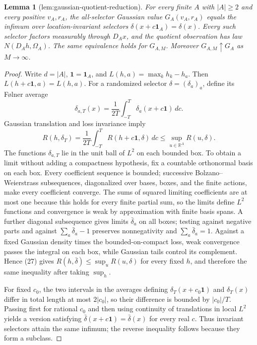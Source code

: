 \documentclass{article}
\newtheorem{lemma}{Lemma}
\begin{document}
\begin{lemma}[lem:gaussian-quotient-reduction]\label{lem:gaussian-quotient-reduction}
For every finite \(A\) with \(|A|\geq2\) and every positive \(v_A,r_A\), the all-selector Gaussian value \(G_A(v_A,r_A)\) equals the infimum over location-invariant selectors \(\delta(x+c\mathbf 1_A)=\delta(x)\).  Every such selector factors measurably through \(D_Ax\), and the quotient observation has law \(N(D_Ah,\Omega_A)\).  The same equivalence holds for \(G_{A,M}\).  Moreover \(G_{A,M}\uparrow G_A\) as \(M\to\infty\).
\end{lemma}
\begin{proof}
Write \(d=|A|\), \(\mathbf1=\mathbf1_A\), and \(L(h,a)=\max_kh_k-h_a\).  Then \(L(h+c\mathbf1,a)=L(h,a)\).  For a randomized selector \(\delta=(\delta_a)_a\), define its F{\o}lner average
\[
 \delta_{a,T}(x)=\frac1{2T}\int_{-T}^T\delta_a(x+c\mathbf1)\,dc.
\]
Gaussian translation and loss invariance imply
\[
 R(h,\delta_T)=\frac1{2T}\int_{-T}^TR(h+c\mathbf1,\delta)\,dc
 \leq\sup_{u\in\mathbb R^A}R(u,\delta). \tag{27}
\]
The functions \(\delta_{a,T}\) lie in the unit ball of \(L^2\) on each bounded box.  To obtain a limit without adding a compactness hypothesis, fix a countable orthonormal basis on each box.  Every coefficient sequence is bounded; successive Bolzano--Weierstrass subsequences, diagonalized over bases, boxes, and the finite actions, make every coefficient converge.  The sums of squared limiting coefficients are at most one because this holds for every finite partial sum, so the limits define \(L^2\) functions and convergence is weak by approximation with finite basis spans.  A further diagonal subsequence gives limits \(\bar\delta_a\) on all boxes; testing against negative parts and against \(\sum_a\bar\delta_a-1\) preserves nonnegativity and \(\sum_a\bar\delta_a=1\).  Against a fixed Gaussian density times the bounded-on-compact loss, weak convergence passes the integral on each box, while Gaussian tails control its complement.  Hence (27) gives \(R(h,\bar\delta)\leq\sup_uR(u,\delta)\) for every fixed \(h\), and therefore the same inequality after taking \(\sup_h\).

For fixed \(c_0\), the two intervals in the averages defining \(\delta_T(x+c_0\mathbf1)\) and \(\delta_T(x)\) differ in total length at most \(2|c_0|\), so their difference is bounded by \(|c_0|/T\).  Passing first for rational \(c_0\) and then using continuity of translations in local \(L^2\) yields a version satisfying \(\bar\delta(x+c\mathbf1)=\bar\delta(x)\) for every real \(c\).  Thus invariant selectors attain the same infimum; the reverse inequality follows because they form a subclass.


\end{proof}
\end{document}
